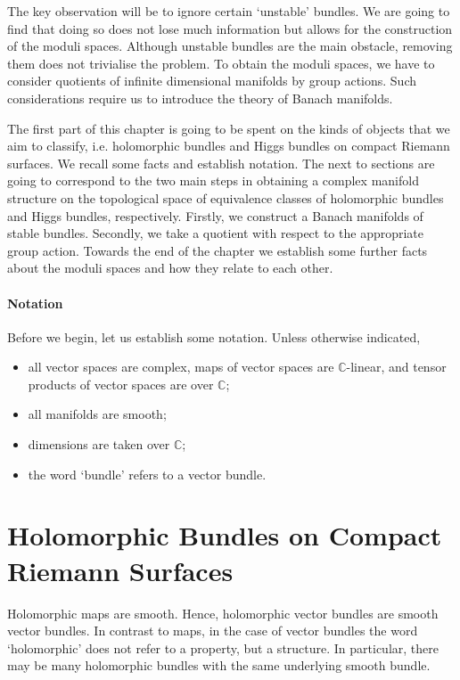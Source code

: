 \documentclass[12pt]{ociamthesis}  %
\begin{document}
The key observation will be to ignore certain `unstable' bundles. We
are going to find that doing so does not lose much information but
allows for the construction of the moduli spaces. Although unstable
bundles are the main obstacle, removing them does not trivialise the
problem. To obtain the moduli spaces, we have to consider quotients
of infinite dimensional manifolds by group actions. Such considerations
require us to introduce the theory of Banach manifolds.

The first part of this chapter is going to be spent on the kinds of
objects that we aim to classify, i.e. holomorphic bundles and Higgs
bundles on compact Riemann surfaces. We recall some facts and establish
notation. The next to sections are going to correspond to the two
main steps in obtaining a complex manifold structure on the topological
space of equivalence classes of holomorphic bundles and Higgs bundles,
respectively. Firstly, we construct a Banach manifolds of stable
bundles. Secondly, we take a quotient with respect to the appropriate
group action. Towards the end of the chapter we establish some
further facts about the moduli spaces and how they relate to each other.

\paragraph*{Notation}

Before we begin, let us establish some notation. Unless otherwise
indicated,

\begin{itemize}
  \item all vector spaces are complex, maps of vector spaces are
        $\mathbb{C}$-linear, and tensor products of vector spaces are
        over $\mathbb{C}$;
  \item all manifolds are smooth;
  \item dimensions are taken over $\mathbb{C}$;
  \item the word `bundle' refers to a vector bundle.
\end{itemize}

\section{Holomorphic Bundles on Compact Riemann Surfaces}

Holomorphic maps are smooth. Hence, holomorphic vector bundles
are smooth vector bundles. In contrast to maps, in the case of vector
bundles the word `holomorphic' does not refer to a property, but
a structure. In particular, there may be many holomorphic bundles with
the same underlying smooth bundle.
\end{document}
